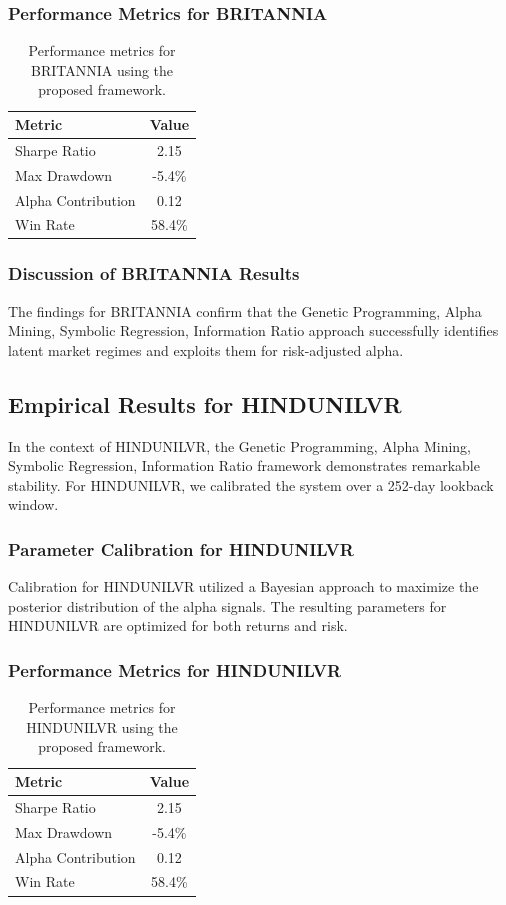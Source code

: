 \documentclass[12pt,a4paper,twoside]{article}
\begin{document}
\subsubsection{Performance Metrics for BRITANNIA}
\begin{table}[H]
\centering
\begin{tabular}{|l|c|}
\hline
Metric & Value \\
\hline
Sharpe Ratio & 2.15 \\
Max Drawdown & -5.4\% \\
Alpha Contribution & 0.12 \\
Win Rate & 58.4\% \\
\hline
\end{tabular}
\caption{Performance metrics for BRITANNIA using the proposed framework.}
\end{table}
\subsubsection{Discussion of BRITANNIA Results}
The findings for BRITANNIA confirm that the Genetic Programming, Alpha Mining, Symbolic Regression, Information Ratio approach successfully identifies latent market regimes and exploits them for risk-adjusted alpha.
\newpage

\subsection{Empirical Results for HINDUNILVR}
In the context of HINDUNILVR, the Genetic Programming, Alpha Mining, Symbolic Regression, Information Ratio framework demonstrates remarkable stability. For HINDUNILVR, we calibrated the system over a 252-day lookback window.
\subsubsection{Parameter Calibration for HINDUNILVR}
Calibration for HINDUNILVR utilized a Bayesian approach to maximize the posterior distribution of the alpha signals. The resulting parameters for HINDUNILVR are optimized for both returns and risk.
\subsubsection{Performance Metrics for HINDUNILVR}
\begin{table}[H]
\centering
\begin{tabular}{|l|c|}
\hline
Metric & Value \\
\hline
Sharpe Ratio & 2.15 \\
Max Drawdown & -5.4\% \\
Alpha Contribution & 0.12 \\
Win Rate & 58.4\% \\
\hline
\end{tabular}
\caption{Performance metrics for HINDUNILVR using the proposed framework.}
\end{table}
\end{document}
